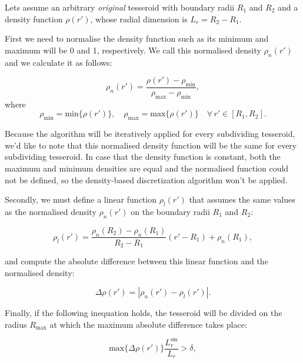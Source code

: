 \documentclass[extra]{gji}
\begin{document}
Lets assume an arbitrary \emph{original} tesseroid with boundary radii
$R_1$ and $R_2$ and a density function $\rho(r')$, whose radial
dimension is $L_r = R_2 - R_1$.

First we need to normalise the density function such as its minimum and
maximum will be 0 and 1, respectively.
We call this normalised density $\rho_n(r')$ and we calculate it as
follows:

\begin{equation}
    \rho_n(r') =
    \frac{\rho(r') - \rho_\text{min}}{\rho_\text{max} - \rho_\text{min}},
\end{equation}
\noindent where
\begin{equation}
    \rho_\text{min} = \text{min}\{ \rho(r') \}, \quad
    \rho_\text{max} = \text{max}\{ \rho(r') \} \quad
    \forall \, r' \in [R_1, R_2].
\end{equation}

\noindent Because the algorithm will be iteratively applied for every
subdividing tesseroid, we'd like to note that this normalised density
function will be the same for every subdividing tesseroid.
In case that the density function is constant, both the maximum and
minimum densities are equal and the normalised function could not
be defined, so the density-based discretization algorithm won't be
applied.

Secondly, we must define a linear function $\rho_l(r')$ that assumes
the same values as the normalised density $\rho_n(r')$ on the boundary
radii $R_1$ and $R_2$:

\begin{equation}
    \rho_l(r') =
    \frac{ \rho_n(R_2) - \rho_n(R_1) }{ R_2 - R_1 } (r' - R_1) + \rho_n(R_1),
    \label{eq:density-reference-line}
\end{equation}

\noindent and compute the absolute difference between this linear
function and the normalised density:

\begin{equation}
    \Delta \rho (r') = | \rho_n(r') - \rho_l(r') |.
    \label{eq:density-abs-diff}
\end{equation}

Finally, if the following inequation holds, the tesseroid will be divided on
the radius $R_\text{max}$ at which the maximum absolute difference takes
place:

\begin{equation}
    \text{max}\{ \Delta \rho(r') \} \frac{L_r^\text{sm}}{L_r} > \delta,
    \label{eq:delta-density}
\end{equation}
\end{document}
